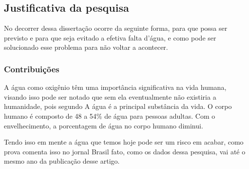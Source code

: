 \subsection{Justificativa da pesquisa} \label{subsec:justif}

No decorrer dessa dissertação ocorre da seguinte forma, para que possa ser previsto e para que seja evitado a efetiva falta d'água, e como pode ser solucionado esse problema para não voltar a acontecer.

\subsubsection{Contribuições} \label{subsubsec:Contribuição}


A água como oxigênio têm uma importância significativa na vida humana, visando isso pode ser notado que sem ela eventualmente não existiria a humanidade, pois segundo  A água é a principal substância da vida. O corpo humano é composto de 48 a 54\% de água para pessoas adultas. Com o envelhecimento, a porcentagem de água no corpo humano diminui.

Tendo isso em mente a água que temos hoje pode ser um risco em acabar, como prova  comenta isso no jornal Brasil fato, como os dados dessa pesquisa, vai até o mesmo ano da publicação desse artigo.

